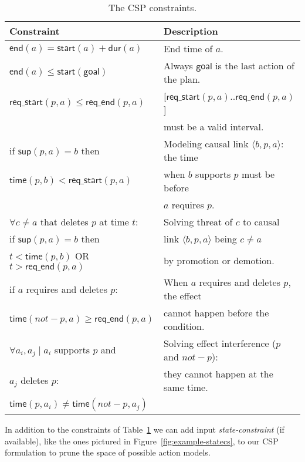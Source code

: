 \documentclass{ecai}
\newcommand{\tup}[1]{{\langle #1 \rangle}}
\newcommand{\dur}{\mathsf{dur}}    %
\newcommand{\start}{\mathsf{start}}%
\newcommand{\en}{\mathsf{end}}     %
\newcommand{\supp}{\mathsf{sup}}   %
\newcommand{\tim}{\mathsf{time}}   %
\newcommand{\reqs}{\mathsf{req\_{start}}} %
\newcommand{\reqe}{\mathsf{req\_{end}}}   %
\newcommand{\goal}{\mathsf{goal}}  %
\begin{document}
\begin{table}
\setlength\extrarowheight{2pt}    
\begin{scriptsize}
\begin{tabular}{ll}
{\bf Constraint} & {\bf Description} \\\hline

$\en(a)=\start(a)+\dur(a)$ & End time of $a$. \\

$\en(a) \leq \start(\goal)$ & Always $\goal$ is the last action of the plan. \\

$\reqs(p,a) \leq \reqe(p,a)$ & [$\reqs(p,a)..\reqe(p,a)$]\\
& must be a valid interval.\\

if $\supp(p,a)=b$ then & Modeling causal link $\tup{b,p,a}$: the time \\
$\tim(p,b) < \reqs(p,a)$ & when $b$ supports $p$ must be before  \\
& $a$ requires $p$. \\

$\forall c \neq a$ that deletes $p$ at time $t$: & Solving threat of $c$ to causal \\
if $\supp(p,a)=b$ then & link $\tup{b,p,a}$ being $c \neq a$ \\
$t < \tim(p,b)$ OR $t > \reqe(p,a)$ & by promotion or demotion.\\

if $a$ requires and deletes $p$: & When $a$ requires and deletes $p$, the effect \\
$\tim(not-p,a) \geq \reqe(p,a)$ & cannot happen before the condition.\\

$\forall a_i,a_j \mid a_i$ supports $p$ and & Solving effect interference ($p$ and $not-p$):\\
$a_j$ deletes $p$: & they cannot happen at the same time.\\
$\tim(p,a_i) \neq \tim(not-p,a_j)$ &
\end{tabular}
\end{scriptsize}
\caption{\small The CSP constraints.}
\label{table:constraints}
\end{table}

In addition to the constraints of Table~\ref{table:constraints} we can add input {\em state-constraint} (if available), like the ones pictured in Figure~\ref{fig:example-statecs}, to our CSP formulation to prune the space of possible action models.
\end{document}
